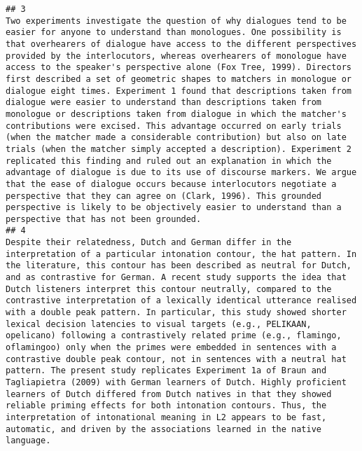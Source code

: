 \documentclass[cm]{glossa}
\begin{document}
\begin{verbatim}
## 3                                                                                                                                                                                                                                                                                                                                                                                                                                        Two experiments investigate the question of why dialogues tend to be easier for anyone to understand than monologues. One possibility is that overhearers of dialogue have access to the different perspectives provided by the interlocutors, whereas overhearers of monologue have access to the speaker's perspective alone (Fox Tree, 1999). Directors first described a set of geometric shapes to matchers in monologue or dialogue eight times. Experiment 1 found that descriptions taken from dialogue were easier to understand than descriptions taken from monologue or descriptions taken from dialogue in which the matcher's contributions were excised. This advantage occurred on early trials (when the matcher made a considerable contribution) but also on late trials (when the matcher simply accepted a description). Experiment 2 replicated this finding and ruled out an explanation in which the advantage of dialogue is due to its use of discourse markers. We argue that the ease of dialogue occurs because interlocutors negotiate a perspective that they can agree on (Clark, 1996). This grounded perspective is likely to be objectively easier to understand than a perspective that has not been grounded.
## 4                                                                                                                                                                                                                                                                                                                                                                                                                                                                                                   Despite their relatedness, Dutch and German differ in the interpretation of a particular intonation contour, the hat pattern. In the literature, this contour has been described as neutral for Dutch, and as contrastive for German. A recent study supports the idea that Dutch listeners interpret this contour neutrally, compared to the contrastive interpretation of a lexically identical utterance realised with a double peak pattern. In particular, this study showed shorter lexical decision latencies to visual targets (e.g., PELIKAAN, opelicano) following a contrastively related prime (e.g., flamingo, oflamingoo) only when the primes were embedded in sentences with a contrastive double peak contour, not in sentences with a neutral hat pattern. The present study replicates Experiment 1a of Braun and Tagliapietra (2009) with German learners of Dutch. Highly proficient learners of Dutch differed from Dutch natives in that they showed reliable priming effects for both intonation contours. Thus, the interpretation of intonational meaning in L2 appears to be fast, automatic, and driven by the associations learned in the native language.

\end{verbatim}
\end{document}
